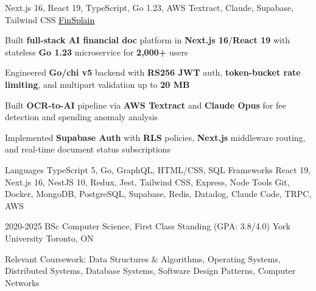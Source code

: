 \documentclass[11pt, a4paper]{awesome-cv}
\begin{document}
\begin{cventries}
\end{cventries}


\begin{cventries}

  \cventry
  {Next.js 16, React 19, TypeScript, Go 1.23, AWS Textract, Claude, Supabase, Tailwind CSS}
  {\href{https://finsplain.net}{\textcolor{black}{\underline{FinSplain}} \faExternalLink}}
  {}
  {}
  {
    \begin{cvitems}
      \item {Built \textbf{full-stack AI financial doc} platform in \textbf{Next.js 16}/\textbf{React 19} with stateless \textbf{Go 1.23} microservice for \textbf{2,000+} users}
      \item {Engineered \textbf{Go/chi v5} backend with \textbf{RS256 JWT} auth, \textbf{token-bucket rate limiting}, and multipart validation up to \textbf{20 MB}}
      \item {Built \textbf{OCR-to-AI} pipeline via \textbf{AWS Textract} and \textbf{Claude Opus} for fee detection and spending anomaly analysis}
      \item {Implemented \textbf{Supabase Auth} with \textbf{RLS} policies, \textbf{Next.js} middleware routing, and real-time document status subscriptions}
    \end{cvitems}
  }

\end{cventries}


\begin{cvskills}
  \cvskill
  {Languages}
  {TypeScript 5, Go, GraphQL, HTML/CSS, SQL}
  \cvskill
  {Frameworks}
  {React 19, Next.js 16, NestJS 10, Redux, Jest, Tailwind CSS, Express, Node}
  \cvskill
  {Tools}
  {Git, Docker, MongoDB, PostgreSQL, Supabase, Redis, Datadog, Claude Code, TRPC, AWS}
\end{cvskills}

\vspace{-2mm}

\begin{cventries}
  \cventry
  {2020-2025}
  {BSc Computer Science, First Class Standing (GPA: 3.8/4.0)}
  {York University}
  {Toronto, ON}
  {%
    \begin{cvitems}
      \item {Relevant Coursework: Data Structures \& Algorithms, Operating Systems, Distributed Systems, Database Systems, Software Design Patterns, Computer Networks}
    \end{cvitems}
  }
\end{cventries}

\end{document}
